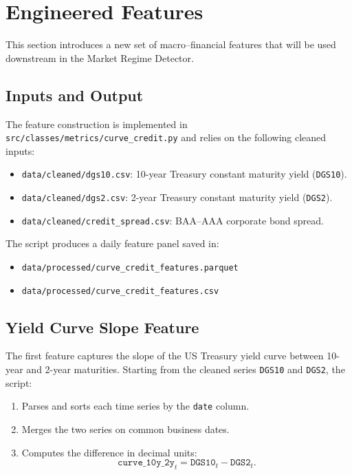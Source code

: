 \documentclass[a4paper,fleqn]{cas-sc}
\begin{document}
\section{Engineered Features}

This section introduces a new set of macro–financial features that will be used downstream in the Market Regime Detector.

\subsection{Inputs and Output}
The feature construction is implemented in \texttt{src/classes/metrics/curve\_credit.py} and relies on the following cleaned inputs:
\begin{itemize}
    \item \texttt{data/cleaned/dgs10.csv}: 10-year Treasury constant maturity yield (\texttt{DGS10}).
    \item \texttt{data/cleaned/dgs2.csv}: 2-year Treasury constant maturity yield (\texttt{DGS2}).
    \item \texttt{data/cleaned/credit\_spread.csv}: BAA--AAA corporate bond spread.
\end{itemize}

The script produces a daily feature panel saved in:
\begin{itemize}
    \item \texttt{data/processed/curve\_credit\_features.parquet}
    \item \texttt{data/processed/curve\_credit\_features.csv}
\end{itemize}

\subsection{Yield Curve Slope Feature}
The first feature captures the slope of the US Treasury yield curve between 10-year and 2-year maturities. Starting from the cleaned series \texttt{DGS10} and \texttt{DGS2}, the script:
\begin{enumerate}
    \item Parses and sorts each time series by the \texttt{date} column.
    \item Merges the two series on common business dates.
    \item Computes the difference in decimal units:
    \[
        \texttt{curve\_10y\_2y}_t = \texttt{DGS10}_t - \texttt{DGS2}_t.
    \]
\end{enumerate}
\end{document}
